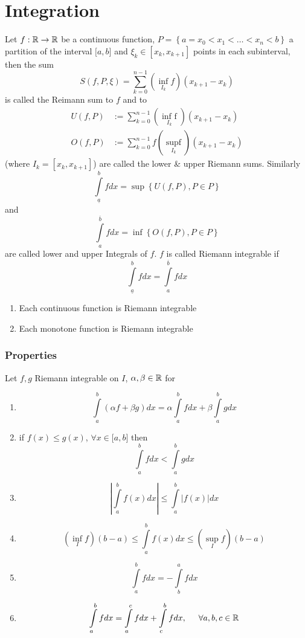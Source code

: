 \documentclass[a4paper]{article}
\begin{document}
\setcounter{page}{0}
\section{Integration}
Let $f:\mathbb{R}\to\mathbb{R}$ be a continuous function, $P=\left\{ a=x_0<x_1<\dots <x_n<b\right\}$ a partition of the interval $\lbrack a,b\rbrack$ and $\xi_k\in\left[ x_k,x_{k+1}\right]$ points in each subinterval, then the sum 
\[S\left( {f,P,\xi } \right) = \sum\limits_{k = 0}^{n - 1} {\left( {\mathop {\inf }\limits_{{I_k}} f} \right)\left( {{x_{k + 1}} - {x_k}} \right)} \]
is called the Reimann sum  to $f$ and to 
\begin{align*}
U(f,P)&:=\sum\limits_{k = 0}^{n-1} {(\mathop {{\text{inf }}f}\limits_{I_k} )} ({x_{k+1}} - {x_{k}})\\
O(f,P)&:=\sum\limits_{k = 0}^{n-1} {f(\mathop {{\text{sup}}f}\limits_{I_k} )} ({x_{k+1}} - {x_{k}})
\end{align*}
(where $I_k=\left[x_k,x_{k+1}\right]$) are called the lower \& upper Riemann sums. Similarly
\[\int\limits_{\underline{a}}^{b} {fdx = \sup\left\{ {U\left( {f,P} \right),P \in P} \right\}} \] 
and
\[\int\limits_a^{\overline{b}} {fdx = \inf \left\{ {O\left( {f,P} \right),P \in P} \right\}} \]
are called lower and upper Integrals of $f$. $f$ is called Riemann integrable if 
\[\int\limits_{\underline{a}}^b {fdx = } \int\limits_a^{\overline{b}} {fdx} \]
\begin{fact}{}
\begin{enumerate}
\item Each continuous function is Riemann integrable
\item Each monotone function is Riemann integrable
\end{enumerate}
\end{fact}
\subsubsection*{Properties}
Let $f,g$ Riemann integrable on $I$, $\alpha,\beta\in\mathbb{R}$ for
\begin{enumerate}
\item \[\int\limits_a^b {\left( {\alpha f + \beta g} \right)dx}  = \alpha \int\limits_a^b {fdx}  + \beta \int\limits_a^b {gdx} \]
\item if $f(x)\leq g(x)$, $\forall x\in\lbrack a,b\rbrack$ then \[\int\limits_a^b {fdx}  < \int\limits_a^b {gdx} \]
\item \[\left| {\int\limits_a^b {f(x)dx} } \right| \le \int\limits_a^b {\left| {f(x)} \right|dx} \]
\item \[\left( {\mathop {\inf }\limits_I f} \right)\left( {b - a} \right) \le \int\limits_a^b {f(x)dx}  \le \left( {\mathop {\sup }\limits_I f} \right)\left( {b - a} \right)\]
\item \[\int\limits_a^b {fdx}  =  - \int\limits_b^a {fdx} \]
\item \[\int\limits_a^b {fdx}  = \int\limits_a^c {fdx}  + \int\limits_c^b {fdx},\hspace{5mm}\forall a,b,c\in\mathbb{R} \]
\end{enumerate}
\end{document}

